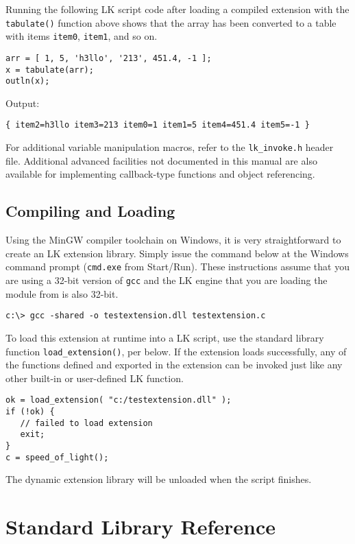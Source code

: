 \documentclass{article}
\begin{document}
Running the following LK script code after loading a compiled extension with the \texttt{tabulate()} function above shows that the array has been converted to a table with items \texttt{item0}, \texttt{item1}, and so on.

\begin{verbatim}
arr = [ 1, 5, 'h3llo', '213', 451.4, -1 ];
x = tabulate(arr);
outln(x);
\end{verbatim}

Output:
\begin{verbatim}
{ item2=h3llo item3=213 item0=1 item1=5 item4=451.4 item5=-1 }
\end{verbatim}


For additional variable manipulation macros, refer to the \texttt{lk\_invoke.h} header file.  Additional advanced facilities not documented in this manual are also available for implementing callback-type functions and object referencing.

\subsection{Compiling and Loading}

Using the MinGW compiler toolchain on Windows, it is very straightforward to create an LK extension library.  Simply issue the command below at the Windows command prompt (\texttt{cmd.exe} from Start/Run).  These instructions assume that you are using a 32-bit version of \texttt{gcc} and the LK engine that you are loading the module from is also 32-bit.

\begin{verbatim}
c:\> gcc -shared -o testextension.dll testextension.c
\end{verbatim}

To load this extension at runtime into a LK script, use the standard library function \texttt{load\_extension()}, per below.  If the extension loads successfully, any of the functions defined and exported in the extension can be invoked just like any other built-in or user-defined LK function.

\begin{verbatim}
ok = load_extension( "c:/testextension.dll" );
if (!ok) {
   // failed to load extension
   exit;
}
c = speed_of_light();
\end{verbatim}

The dynamic extension library will be unloaded when the script finishes.



\section{Standard Library Reference}
\end{document}
